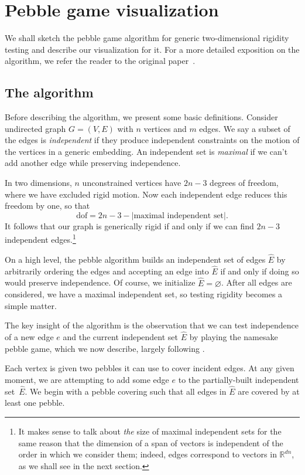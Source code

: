 \documentclass[aps,prd,final,twocolumn,letterpaper,nofootinbib]{revtex4-1}
\newcommand\RR{\mathbb{R}}
\newcommand{\abs}[1]{|#1|}
\begin{document}
\section{Pebble game visualization}
\label{sec:pebble}

We shall sketch the pebble game algorithm
for generic two-dimensional rigidity testing
and describe our visualization for it.
For a more detailed exposition on the algorithm,
we refer the reader to the original paper~\cite{jacobs97}.

\subsection{The algorithm}

Before describing the algorithm,
we present some basic definitions.
Consider undirected graph $G = (V, E)$
with $n$ vertices and $m$ edges.
We say a subset of the edges is \emph{independent}
if they produce independent constraints on the motion of the vertices
in a generic embedding.
An independent set is \emph{maximal} if we can't add another edge
while preserving independence.

In two dimensions, $n$ unconstrained vertices have $2n-3$ degrees of freedom,
where we have excluded rigid motion.
Now each independent edge reduces this freedom by one,
so that
\[
    \text{dof} = 2n - 3 - \abs{\text{maximal independent set}}.
\]
It follows that our graph is generically rigid
if and only if we can find $2n-3$ independent edges.\footnote{It makes sense
to talk about \emph{the} size 
of maximal independent sets
for the same reason that the dimension of a span of vectors
is independent of the order in which we consider them;
indeed, edges correspond to vectors in $\RR^{dn}$,
as we shall see in the next section.}

On a high level,
the pebble algorithm builds an independent set of edges $\hat E$
by arbitrarily ordering the edges
and accepting an edge into $\hat E$
if and only if doing so would preserve independence.
Of course, we initialize $\hat E = \varnothing$.
After all edges are considered,
we have a maximal independent set,
so testing rigidity becomes a simple matter.

The key insight of the algorithm
is the observation that we can test independence of a new edge $e$
and the current independent set $\hat E$
by playing the namesake pebble game,
which we now describe, largely following \cite{stjohnapplet}.

Each vertex is given two pebbles it can use to cover incident edges.
At any given moment, we are attempting to add some edge $e$
to the partially-built independent set~$\hat E$.
We begin with a pebble covering such that all edges in $\hat E$
are covered by at least one pebble.
\end{document}
